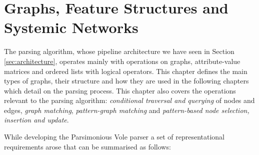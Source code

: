 \chapter{Graphs, Feature Structures and Systemic Networks}
\label{ch:data-structures}

%

The parsing algorithm, whose pipeline architecture we have seen in Section \ref{sec:architecture}, operates mainly with operations on graphs, attribute-value matrices and ordered lists with logical operators. This chapter defines the main types of graphs, their structure and how they are used in the following chapters which detail on the parsing process. This chapter also covers the operations relevant to the parsing algorithm: \textit{conditional traversal and querying} of nodes and edges, \textit{graph matching}, \textit{pattern-graph matching} and \textit{pattern-based node selection, insertion and update}.

While developing the Parsimonious Vole parser a set of representational requirements arose that can be summarised as follows:

